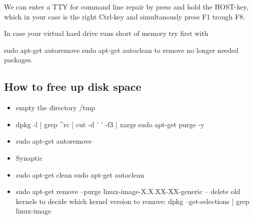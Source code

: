 \documentclass[11pt, oneside]{article}   	%
\begin{document}
We can enter a TTY for command line repair by press and hold the HOST-key, which in your case is the right Ctrl-key and simultanously press F1 trough F8.

In case your virtual hard drive runs short of memory try first with

sudo apt-get autoremove
sudo apt-get autoclean
to remove no longer needed packages.


\subsection{How to free up disk space}

\begin{itemize}
\item empty the directory /tmp
\item dpkg -l | grep ^rc | cut -d ' ' -f3 | xargs sudo apt-get purge -y
\item sudo apt-get autoremove
\item Synaptic
\item sudo apt-get clean
\ietm sudo apt-get autoclean
\item sudo apt-get remove --purge linux-image-X.X.XX-XX-generic    -- delete old kernels
to decide which kernel version to remove: dpkg --get-selections | grep linux-image
\end{itemize}
\end{document}
